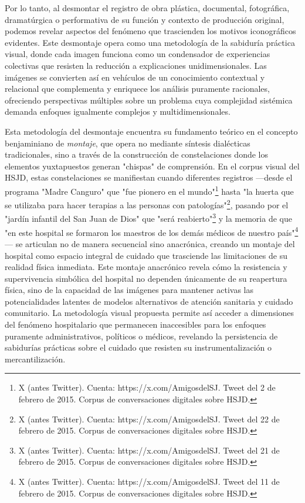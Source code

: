 Por lo tanto, al desmontar el registro de obra plástica, documental, fotográfica, dramatúrgica o performativa de su función y contexto de producción original, podemos revelar aspectos del fenómeno que trascienden los motivos iconográficos evidentes. Este desmontaje opera como una metodología de la sabiduría práctica visual, donde cada imagen funciona como un condensador de experiencias colectivas que resisten la reducción a explicaciones unidimensionales. Las imágenes se convierten así en vehículos de un conocimiento contextual y relacional que complementa y enriquece los análisis puramente racionales, ofreciendo perspectivas múltiples sobre un problema cuya complejidad sistémica demanda enfoques igualmente complejos y multidimensionales.

Esta metodología del desmontaje encuentra su fundamento teórico en el concepto benjaminiano de \textit{montaje}, que opera no mediante síntesis dialécticas tradicionales, sino a través de la construcción de constelaciones donde los elementos yuxtapuestos generan "chispas" de comprensión. En el corpus visual del HSJD, estas constelaciones se manifiestan cuando diferentes registros —desde el programa "Madre Canguro" que "fue pionero en el mundo"\footnote{X (antes Twitter). Cuenta: https://x.com/AmigosdelSJ. Tweet del 2 de febrero de 2015. Corpus de conversaciones digitales sobre HSJD.} hasta "la huerta que se utilizaba para hacer terapias a las personas con patologías"\footnote{X (antes Twitter). Cuenta: https://x.com/AmigosdelSJ. Tweet del 22 de febrero de 2015. Corpus de conversaciones digitales sobre HSJD.}, pasando por el "jardín infantil del San Juan de Dios" que "será reabierto"\footnote{X (antes Twitter). Cuenta: https://x.com/AmigosdelSJ. Tweet del 21 de febrero de 2015. Corpus de conversaciones digitales sobre HSJD.} y la memoria de que "en este hospital se formaron los maestros de los demás médicos de nuestro país"\footnote{X (antes Twitter). Cuenta: https://x.com/AmigosdelSJ. Tweet del 11 de febrero de 2015. Corpus de conversaciones digitales sobre HSJD.}— se articulan no de manera secuencial sino anacrónica, creando un montaje del hospital como espacio integral de cuidado que trasciende las limitaciones de su realidad física inmediata. Este montaje anacrónico revela cómo la resistencia y supervivencia simbólica del hospital no dependen únicamente de su reapertura física, sino de la capacidad de las imágenes para mantener activas las potencialidades latentes de modelos alternativos de atención sanitaria y cuidado comunitario. La metodología visual propuesta permite así acceder a dimensiones del fenómeno hospitalario que permanecen inaccesibles para los enfoques puramente administrativos, políticos o médicos, revelando la persistencia de sabidurías prácticas sobre el cuidado que resisten su instrumentalización o mercantilización.

